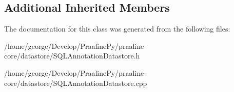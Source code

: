 \subsection*{Additional Inherited Members}


The documentation for this class was generated from the following files\+:\begin{DoxyCompactItemize}
\item 
/home/george/\+Develop/\+Praaline\+Py/praaline-\/core/datastore/S\+Q\+L\+Annotation\+Datastore.\+h\item 
/home/george/\+Develop/\+Praaline\+Py/praaline-\/core/datastore/S\+Q\+L\+Annotation\+Datastore.\+cpp\end{DoxyCompactItemize}
